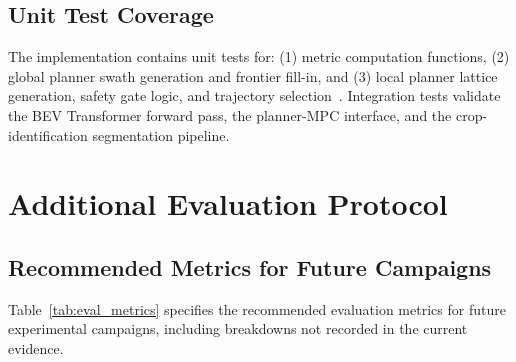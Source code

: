 \documentclass[12pt, a4paper]{article}
\begin{document}
\section{Unit Test Coverage}

The implementation contains unit tests for: (1) metric computation functions,
(2) global planner swath generation and frontier fill-in, and (3) local planner
lattice generation, safety gate logic, and trajectory selection~\cite{ref234}.
Integration tests validate the BEV Transformer forward pass, the planner-MPC
interface, and the crop-identification segmentation pipeline.

\chapter{Additional Evaluation Protocol}
\label{app:evalprotocol}

\section{Recommended Metrics for Future Campaigns}

Table~\ref{tab:eval_metrics} specifies the recommended evaluation metrics for future
experimental campaigns, including breakdowns not recorded in the current evidence.
\end{document}
